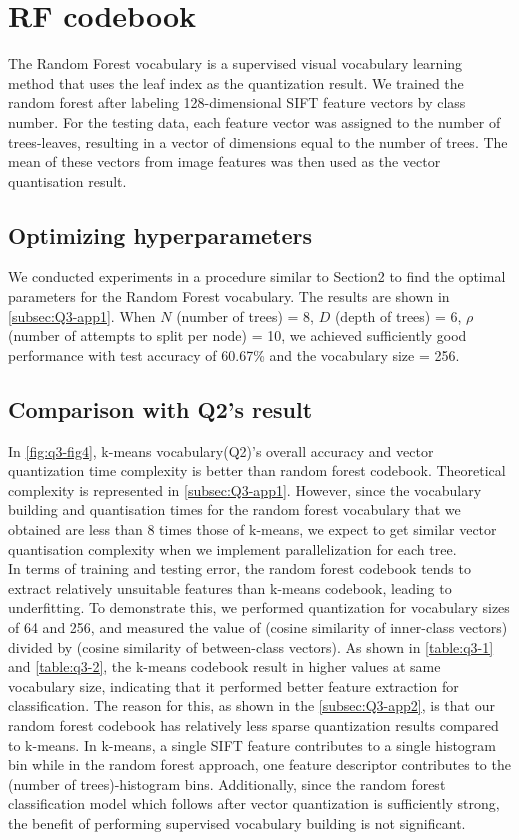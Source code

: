 \section{RF codebook}
\label{sec:intro}
The Random Forest vocabulary is a supervised visual vocabulary learning method that uses the leaf index as the quantization result. We trained the random forest after labeling 128-dimensional SIFT feature vectors by class number. For the testing data, each feature vector was assigned to the number of trees-leaves, resulting in a vector of dimensions equal to the number of trees. The mean of these vectors from image features was then used as the vector quantisation result.

\subsection{Optimizing hyperparameters}
We conducted experiments in a procedure similar to Section2 to find the optimal parameters for the Random Forest vocabulary. The results are shown in \cref{subsec:Q3-app1}. When $N$ (number of trees) = 8, $D$ (depth of trees) = 6, $\rho$ (number of attempts to split per node) = 10, we achieved sufficiently good performance with test accuracy of 60.67\% and the vocabulary size = 256.

\subsection{Comparison with Q2's result}
In \cref{fig:q3-fig4}, k-means vocabulary(Q2)'s overall accuracy and vector quantization time complexity is better than random forest codebook. Theoretical complexity is represented in \cref{subsec:Q3-app1}. However, since the vocabulary building and quantisation times for the random forest vocabulary that we obtained are less than 8 times those of k-means, we expect to get similar vector quantisation complexity when we implement parallelization for each tree.\\
In terms of training and testing error, the random forest codebook tends to extract relatively unsuitable features than k-means codebook, leading to underfitting. To demonstrate this, we performed quantization for vocabulary sizes of 64 and 256, and measured the value of (cosine similarity of inner-class vectors) divided by (cosine similarity of between-class vectors). As shown in \cref{table:q3-1} and \cref{table:q3-2}, the k-means codebook result in higher values at same vocabulary size, indicating that it performed better feature extraction for classification. The reason for this, as shown in the \cref{subsec:Q3-app2}, is that our random forest codebook has relatively less sparse quantization results compared to k-means. In k-means, a single SIFT feature contributes to a single histogram bin while in the random forest approach, one feature descriptor contributes to the (number of trees)-histogram bins. Additionally, since the random forest classification model which follows after vector quantization is sufficiently strong, the benefit of performing supervised vocabulary building is not significant.


